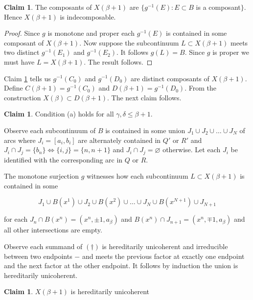 \documentclass[12pt]{article}
\theoremstyle{plain}
\theoremstyle{definition}
\newcounter{ClaimCounter}
\newtheorem{claim}[ClaimCounter]{Claim}
\newcounter{claim5counter}
\newcommand{\B}{\ensuremath{\beta}}
\newcommand{\G}{\ensuremath{\gamma}}
\newcommand{\D}{\ensuremath{\delta}}
\newcommand{\0}{\ensuremath{\varnothing}}
\begin{document}
	
	
	
	\begin{claim}\label{comps}
		The composants of $X(\B+1)$ are $\{g^{-1}(E): E \subset B$ is a composant$\}$.
		Hence $X(\B+1)$ is indecomposable.
	\end{claim}
	
	\begin{proof}
		Since $g$ is monotone and proper each $g^{-1}(E)$ is contained in some composant of $X(\B+1)$.
		Now suppose the subcontinuum $L \subset X(\B+1)$ meets two distinct $g^{-1}(E_1)$ and $g^{-1}(E_2)$.
		It follows $g(L) = B$.
		Since $g$ is proper we must have $L = X(\B+1)$.
		The result follows.
	\end{proof}
	
	Claim \ref{comps} tells us $g^{-1}(C_0)$ and $g^{-1}(D_0)$ are distinct composants of \mbox{$X(\B+1)$}. 
	Define $C(\B+1) = g^{-1}(C_0)$ and $D(\B+1) = g^{-1}(D_0)$.
	From the construction $X(\B) \subset D(\B+1)$.
	The next claim follows.
	
	\begin{claim} 
		Condition (a) holds for all $\G,\D \le \B+1$.
	\end{claim}
	
	Observe each subcontinuum of $B$ is contained in some union $J_1 \cup J_2 \cup \ldots \cup J_N$ of arcs where 
	$J_i = [a_i,b_i]$ are alternately contained in $Q'$ or $R'$
	and $J_i \cap J_j = \{b_n\} \iff \{i,j\} = \{n,n+1\}$ and $J_i \cap J_j = \0$ otherwise.
	Let each $J_i$ be identified with the corresponding arc in $Q$ or $R$.
	
	The monotone surjection $g$ witnesses how each subcontinuum $L \subset X(\B+1)$ is contained in some
	
	\begin{equation}
	J_1 \cup B(x^1) \cup J_2 \cup B(x^2) \cup \ldots \cup J_{N} \cup B(x^{N+1}) \cup J_{N+1} \tag{\dag}
	\end{equation}
	
	for each $J_n \cap B(x^n) = (x^n,\pm 1,a_\B)$ and $ B(x^{n}) \cap J_{n+1} = (x^n,\mp 1,a_\B)$ and all other intersections are empty.
	
	Observe each summand of $(\dag)$ is hereditarily unicoherent and irreducible between two endpoints $-$
	and meets the previous factor at exactly one endpoint and the next factor at the other endpoint.
	It follows by induction the union is hereditarily unicoherent.
	
	\begin{claim}
		$X(\B+1)$ is hereditarily unicoherent
	\end{claim}
	
\end{document}
